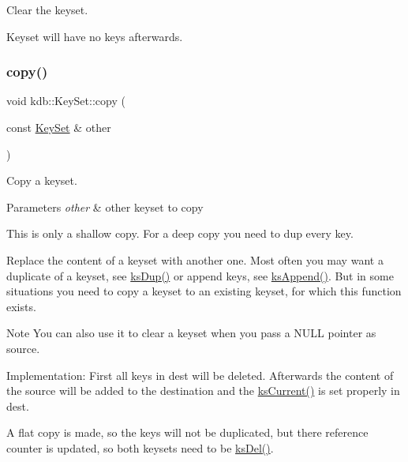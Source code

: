 Clear the keyset. 

Keyset will have no keys afterwards. \mbox{\label{classkdb_1_1KeySet_a28fd33fdaecf1d57d4dddac7058f5d38}} 
\subsubsection{\texorpdfstring{copy()}{copy()}}
{\footnotesize\ttfamily void kdb\+::\+Key\+Set\+::copy (\begin{DoxyParamCaption}\item[{const \mbox{\hyperlink{classkdb_1_1KeySet}{Key\+Set}} \&}]{other }\end{DoxyParamCaption})\hspace{0.3cm}{\ttfamily [inline]}}



Copy a keyset. 


\begin{DoxyParams}{Parameters}
{\em other} & other keyset to copy\\
\hline
\end{DoxyParams}
This is only a shallow copy. For a deep copy you need to dup every key.

Replace the content of a keyset with another one. Most often you may want a duplicate of a keyset, see \mbox{\hyperlink{group__keyset_gac59e4b328245463f1451f68d5106151c}{ks\+Dup()}} or append keys, see \mbox{\hyperlink{group__keyset_ga21eb9c3a14a604ee3a8bdc779232e7b7}{ks\+Append()}}. But in some situations you need to copy a keyset to an existing keyset, for which this function exists.

\begin{DoxyNote}{Note}
You can also use it to clear a keyset when you pass a N\+U\+LL pointer as {\ttfamily source}.
\end{DoxyNote}
\begin{DoxyParagraph}{Implementation\+:}
First all keys in {\ttfamily dest} will be deleted. Afterwards the content of the source will be added to the destination and the \mbox{\hyperlink{group__keyset_ga4287b9416912c5f2ab9c195cb74fb094}{ks\+Current()}} is set properly in {\ttfamily dest}.
\end{DoxyParagraph}
A flat copy is made, so the keys will not be duplicated, but there reference counter is updated, so both keysets need to be \mbox{\hyperlink{group__keyset_ga27e5c16473b02a422238c8d970db7ac8}{ks\+Del()}}.

